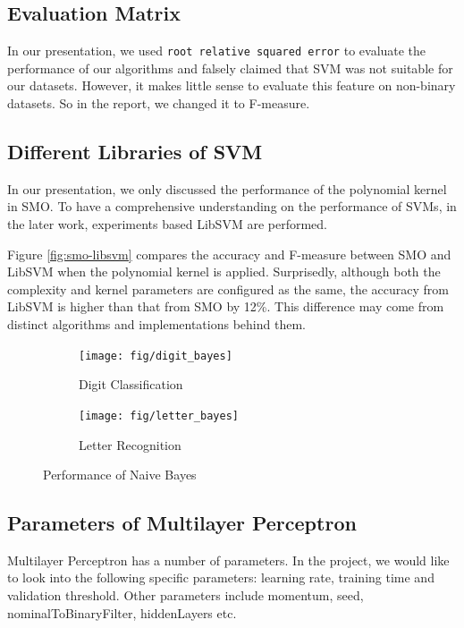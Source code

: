 \documentclass[11pt]{article}
\begin{document}
\subsection{Evaluation Matrix}
In our presentation, we used \texttt{root relative squared error} to evaluate the performance of our algorithms and falsely claimed that SVM was not suitable for our datasets. However, it makes little sense to evaluate this feature on  non-binary datasets. So in the report, we changed it to F-measure.

\subsection{Different Libraries of SVM}

In our presentation, we only discussed the performance of the polynomial kernel in SMO. To have a comprehensive understanding on the performance of SVMs, in the later work, experiments based LibSVM are performed.

Figure \ref{fig:smo-libsvm} compares the accuracy and F-measure between SMO and LibSVM when the polynomial kernel is applied. Surprisedly, although both the complexity and kernel parameters are configured as the same, the accuracy from LibSVM is higher than that from SMO by 12\%. This difference may come from distinct algorithms and implementations behind them.

\begin{figure}[htbp]
\centering

\begin{subfigure}[htbp]{0.46\columnwidth}
\texttt{[image: fig/digit\_bayes]}
\caption{Digit Classification}
\label{fig:digit-bayes}
\end{subfigure}
\hfill
\begin{subfigure}[htbp]{0.46\columnwidth}
\texttt{[image: fig/letter\_bayes]}
\caption{Letter Recognition}
\label{fig:letter-bayes}
\end{subfigure}
\caption{Performance of Naive Bayes}
\label{fig:bayes}
\end{figure}

\subsection{Parameters of Multilayer Perceptron}
Multilayer Perceptron has a number of parameters. In the project, we would like to look into the following specific parameters: learning rate, training time and validation threshold. Other parameters include momentum, seed, nominalToBinaryFilter, hiddenLayers etc.
\end{document}
